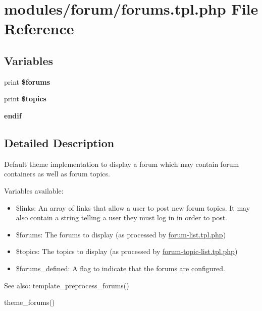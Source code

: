 \hypertarget{forums_8tpl_8php}{
\section{modules/forum/forums.tpl.php File Reference}
\label{forums_8tpl_8php}
}
\subsection*{Variables}
\begin{CompactItemize}
\item 
\hypertarget{forums_8tpl_8php_82a18468a5aa086447f068ce0eae2f17}{
print \textbf{\$forums}}
\label{forums_8tpl_8php_82a18468a5aa086447f068ce0eae2f17}

\item 
\hypertarget{forums_8tpl_8php_99ed588a374cf92f1cedee8834248f61}{
print \textbf{\$topics}}
\label{forums_8tpl_8php_99ed588a374cf92f1cedee8834248f61}

\item 
\hypertarget{forums_8tpl_8php_82cd33ca97ff99f2fcc5e9c81d65251b}{
\textbf{endif}}
\label{forums_8tpl_8php_82cd33ca97ff99f2fcc5e9c81d65251b}

\end{CompactItemize}


\subsection{Detailed Description}
Default theme implementation to display a forum which may contain forum containers as well as forum topics.

Variables available:\begin{itemize}
\item \$links: An array of links that allow a user to post new forum topics. It may also contain a string telling a user they must log in in order to post.\item \$forums: The forums to display (as processed by \hyperlink{forum-list_8tpl_8php}{forum-list.tpl.php})\item \$topics: The topics to display (as processed by \hyperlink{forum-topic-list_8tpl_8php}{forum-topic-list.tpl.php})\item \$forums\_\-defined: A flag to indicate that the forums are configured.\end{itemize}


\begin{Desc}
\item[See also:]template\_\-preprocess\_\-forums() 

theme\_\-forums() \end{Desc}
